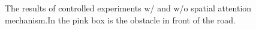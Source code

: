 \documentclass[letterpaper,10 pt,conference]{ieeeconf}  %
\begin{document}
\begin{figure}
    \centering
    \setlength{\belowcaptionskip}{-0.6cm}
    \quad
    \caption{The results of controlled experiments w/ and w/o spatial attention mechanism.In the pink box is the obstacle in front of the road.}
    \label{without_spa_att}
\end{figure}
\end{document}

